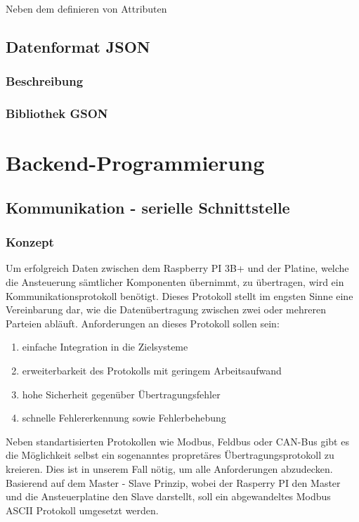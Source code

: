 Neben dem definieren von Attributen

\subsection{Datenformat JSON}\label{subsec:json}

\subsubsection{Beschreibung}

\subsubsection{Bibliothek GSON}

\section{Backend-Programmierung}\label{sec:backend-programmierung}
\subsection{Kommunikation - serielle Schnittstelle}\label{subsec:kommunikation---serielle-schnittstelle}
\subsubsection{Konzept}
Um erfolgreich Daten zwischen dem Raspberry PI 3B+ und der Platine, welche die Ansteuerung sämtlicher Komponenten übernimmt, zu übertragen, wird ein Kommunikationsprotokoll benötigt.
Dieses Protokoll stellt im engsten Sinne eine Vereinbarung dar, wie die Datenübertragung zwischen zwei oder mehreren Parteien abläuft.
Anforderungen an dieses Protokoll sollen sein:
\begin{enumerate}
    \item einfache Integration in die Zielsysteme
    \item erweiterbarkeit des Protokolls mit geringem Arbeitsaufwand
    \item hohe Sicherheit gegenüber Übertragungsfehler
    \item schnelle Fehlererkennung sowie Fehlerbehebung
\end{enumerate}
Neben standartisierten Protokollen wie Modbus, Feldbus oder CAN-Bus gibt es die Möglichkeit selbst ein sogenanntes propretäres Übertragungsprotokoll zu kreieren.
Dies ist in unserem Fall nötig, um alle Anforderungen abzudecken.
Basierend auf dem Master - Slave Prinzip, wobei der Rasperry PI den Master und die Ansteuerplatine den Slave darstellt, soll ein abgewandeltes Modbus ASCII Protokoll umgesetzt werden.

